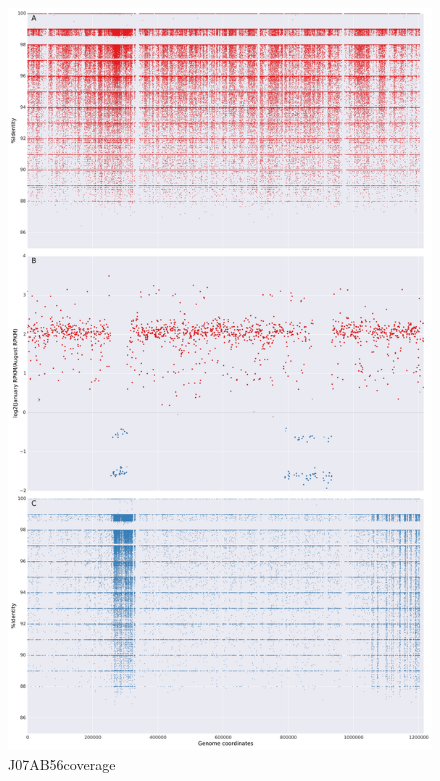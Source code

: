 \begin{figure}[!hbtp]
  \centering
  \includegraphics[width=\textwidth,height=\textheight,keepaspectratio]{Chapter5/Figures/coverage_plots/J07AB56_coverage.pdf}
  \caption{J07AB56coverage}
  \label{J07AB56coverage}
\end{figure}

